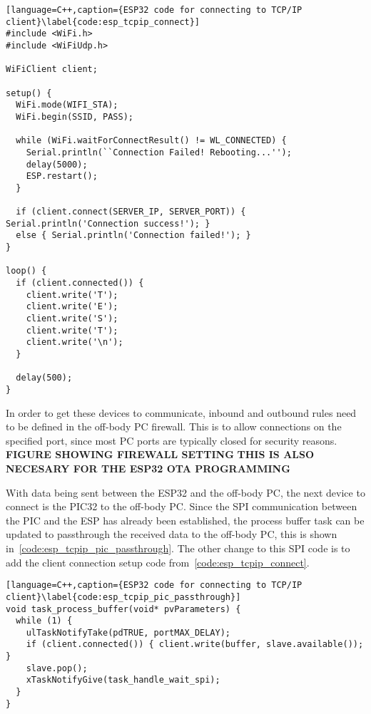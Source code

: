 \begin{lstlisting}[language=C++,caption={ESP32 code for connecting to TCP/IP client}\label{code:esp_tcpip_connect}]
#include <WiFi.h>
#include <WiFiUdp.h>

WiFiClient client;

setup() {
  WiFi.mode(WIFI_STA);
  WiFi.begin(SSID, PASS);

  while (WiFi.waitForConnectResult() != WL_CONNECTED) {
    Serial.println(``Connection Failed! Rebooting...'');
    delay(5000);
    ESP.restart();
  }

  if (client.connect(SERVER_IP, SERVER_PORT)) { Serial.println('Connection success!'); }
  else { Serial.println('Connection failed!'); }
}

loop() {
  if (client.connected()) {
    client.write('T');
    client.write('E');
    client.write('S');
    client.write('T');
    client.write('\n');
  }

  delay(500);
}
\end{lstlisting}



In order to get these devices to communicate, inbound and outbound rules need to be defined in the off-body PC firewall.
This is to allow connections on the specified port, since most PC ports are typically closed for security reasons.
\textbf{FIGURE SHOWING FIREWALL SETTING}
\textbf{THIS IS ALSO NECESARY FOR THE ESP32 OTA PROGRAMMING}

With data being sent between the ESP32 and the off-body PC, the next device to connect is the PIC32 to the off-body PC.
Since the SPI communication between the PIC and the ESP has already been established,
the process buffer task can be updated to passthrough the received data to the off-body PC, this is shown in~\autoref{code:esp_tcpip_pic_passthrough}.
The other change to this SPI code is to add the client connection setup code from~\autoref{code:esp_tcpip_connect}.

\begin{lstlisting}[language=C++,caption={ESP32 code for connecting to TCP/IP client}\label{code:esp_tcpip_pic_passthrough}]
void task_process_buffer(void* pvParameters) {
  while (1) {
    ulTaskNotifyTake(pdTRUE, portMAX_DELAY);
    if (client.connected()) { client.write(buffer, slave.available()); }
    slave.pop();
    xTaskNotifyGive(task_handle_wait_spi);
  }
}
\end{lstlisting}


